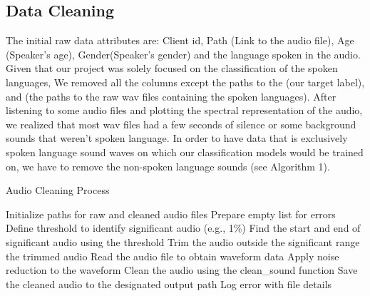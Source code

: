 \documentclass[twocolumn]{article}
\begin{document}
\subsection{Data Cleaning}
The initial raw data attributes are: Client id, Path (Link to the audio file), Age (Speaker's age), Gender(Speaker's gender) and the language spoken in the audio.\\

Given that our project was solely focused on the classification of the spoken languages, We removed all the columns except the paths to the  (our target label), and  (the paths to the raw wav files containing the spoken languages). After listening to some audio files and plotting the spectral representation of the audio, we realized that most wav files had a few seconds of silence or some background sounds that weren't spoken language. In order to have data that is exclusively spoken language sound waves on which our classification models would be trained on, we have to remove the non-spoken language sounds (see Algorithm 1).  
\begin{algorithm}
\caption{Audio Cleaning Process}
\begin{algorithmic}[1]
\State Initialize paths for raw and cleaned audio files
\State Prepare empty list for errors
    \State Define threshold to identify significant audio (e.g., 1\%)
    \State Find the start and end of significant audio using the threshold
    \State Trim the audio outside the significant range
    \State \Return the trimmed audio
\EndFunction
{}
        \State Read the audio file to obtain waveform data
        \State Apply noise reduction to the waveform
        \Try
            \State Clean the audio using the clean\_sound function
            \State Save the cleaned audio to the designated output path
        \Except
            \State Log error with file details
        \EndTry
\end{algorithmic}
\end{algorithm}
\end{document}
